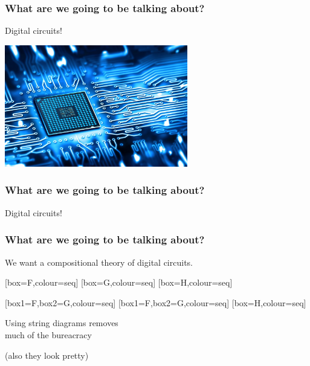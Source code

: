 \begin{frame}
    \frametitle{What are we going to be talking about?}
    \await
    \centering
    \LARGE
    Digital circuits!

    \includegraphics[width=0.6\textwidth]{imgs/circuit}
\end{frame}
\begin{frame}
    \frametitle{What are we going to be talking about?}
    \centering
    \LARGE
    Digital circuits!

    \vspace{1em}
    \normalsize

\end{frame}
\begin{frame}
    \frametitle{What are we going to be talking about?}

    \centering
    \Large
    We want a \alert{compositional} theory of digital circuits.

    \vspace{1em}

    \normalsize

    \await
    [box=F,colour=seq]
    \await
    \quad
    [box=G,colour=seq]
    \await
    \quad
    [box=H,colour=seq]

    \await
    \vspace{1em}

    [box1=F,box2=G,colour=seq]
    \quad
    [box1=F,box2=G,colour=seq]
    \quad
    [box=H,colour=seq]

    \await

    \Large
    \vspace{1em}

    Using \alert{string diagrams} removes \\ much of the bureacracy

    \await

    \normalsize

    (also they look pretty)

\end{frame}

